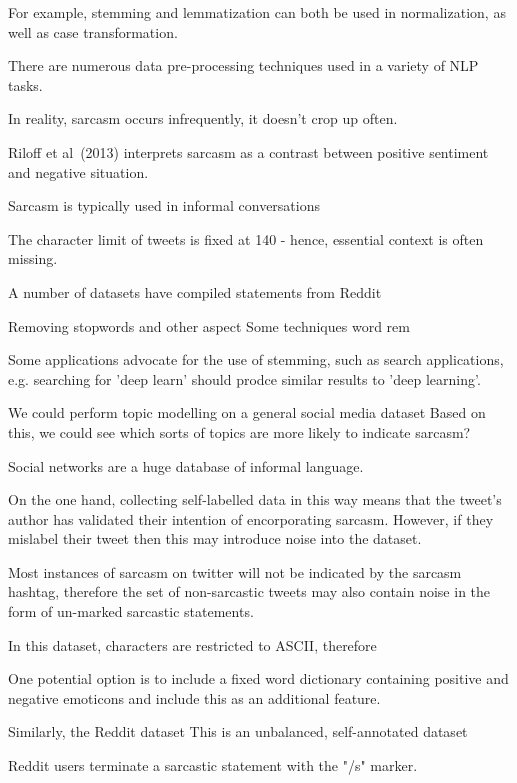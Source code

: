 \documentclass[12pt,a4paper]{article}
\begin{document}
For example, stemming and lemmatization can both be used in normalization, as well as case transformation.

There are numerous data pre-processing techniques used in a variety of NLP tasks.


In reality, sarcasm occurs infrequently, it doesn't crop up often. 


Riloff et al\ (2013) interprets sarcasm as a contrast between positive sentiment and negative situation.


Sarcasm is typically used in informal conversations



The character limit of tweets is fixed at 140 - hence, essential context is often missing. 


A number of datasets have compiled statements from Reddit \cite{wallace2014humans,khodak2017large}

Removing stopwords and other aspect
Some techniques word rem

Some applications advocate for the use of stemming, such as search applications, e.g. searching for 'deep learn' should prodce similar results to 'deep learning'. 

We could perform topic modelling on a general social media dataset
Based on this, we could see which sorts of topics are more likely to indicate sarcasm?



Social networks are a huge database of informal language. 


On the one hand, collecting self-labelled data in this way means that the tweet's author has validated their intention of encorporating sarcasm. However, if they mislabel their tweet then this may introduce noise into the dataset. 

Most instances of sarcasm on twitter will not be indicated by the sarcasm hashtag, therefore the set of non-sarcastic tweets may also contain noise in the form of un-marked sarcastic statements.

In this dataset, characters are restricted to ASCII, therefore 

One potential option is to include a fixed word dictionary containing positive and negative emoticons and include this as an additional feature.




Similarly, the Reddit dataset \cite{khodak2017large} 
This is an unbalanced, self-annotated dataset

Reddit users terminate a sarcastic statement with the "/s" marker. 
\end{document}
